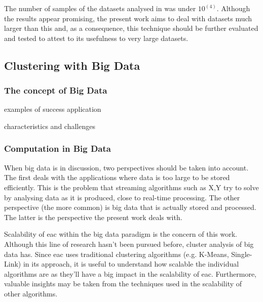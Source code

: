 The number of samples of the datasets analysed in \cite{Lourenco2010} was under $10^(4)$. Although the results appear promising, the present work aims to deal with datasets much larger than this and, as a consequence, this technique should be further evaluated and tested to attest to its usefulness to very large datasets.

\subsection{Clustering with Big Data}

\subsubsection{The concept of Big Data}

examples of success application

characteristics and challenges


\subsubsection{Computation in Big Data}
When big data is in discussion, two perspectives should be taken into account. The first deals with the applications where data is too large to be stored efficiently. This is the problem that streaming algorithms such as X,Y try to solve by analysing data as it is produced, close to real-time processing. %
The other perspective (the more common) is big data that is actually stored and processed. The latter is the perspective the present work deals with.

Scalability of \gls{eac} within the big data paradigm is the concern of this work. Although this line of research hasn't been pursued before, cluster analysis of big data has. %
Since \gls{eac} uses traditional clustering algorithms (e.g. K-Means, Single-Link) in its approach, it is useful to understand how scalable the individual algorithms are as they'll have a big impact in the scalability of \gls{eac}. Furthermore, valuable insights may be taken from the techniques used in the scalability of other algorithms.


